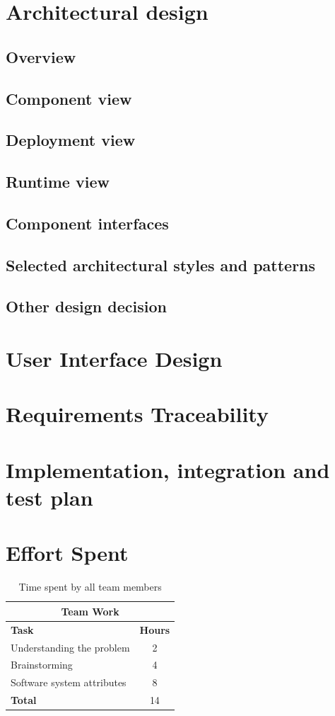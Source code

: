 \documentclass{article}
\begin{document}
	\section{Architectural design}
		\subsection{Overview}
		\subsection{Component view}
		\subsection{Deployment	view}
		\subsection{Runtime	view}
		\subsection{Component interfaces}
		\subsection{Selected architectural styles and patterns}
		\subsection{Other design decision}
	\clearpage	
	\section{User Interface Design}
	\clearpage	
	\section{Requirements Traceability}
	\clearpage	
	\section{Implementation, integration and test plan}
	
	\clearpage
	\section{Effort Spent}
		\begin{table}[h]
			\centering
			\begin{tabular}{l c}
				\hline\hline
				\multicolumn{2}{c}{\textbf{Team Work}} \\
				\hline
				\textbf{Task} & \textbf{Hours} \\ [0.5ex]
				\hline
				Understanding the problem & 2  \\
				Brainstorming & 4 \\
				Software system attributes & 8 \\
				\hline
				\textbf{Total} & 14  \\
				\hline
			\end{tabular}
			\caption{Time spent by all team members}
			\label{fig:Time spent by all team members}
		\end{table}
		
\end{document}
